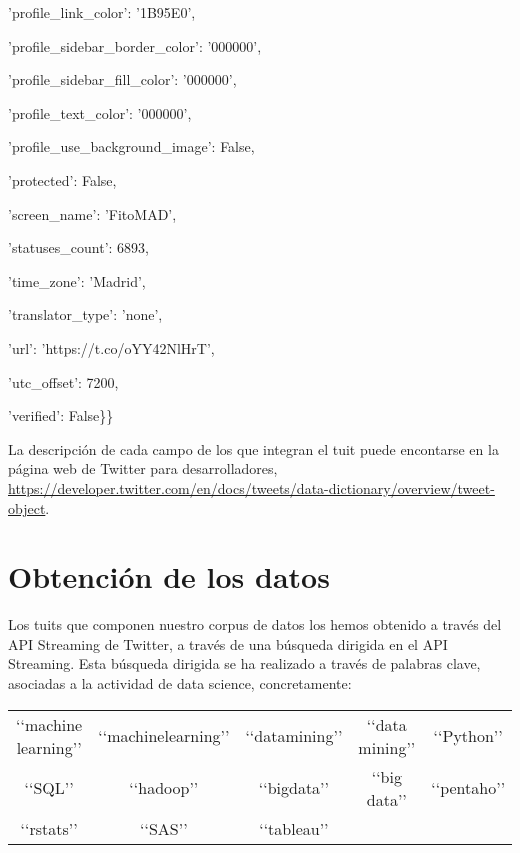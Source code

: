 \hspace{1.7cm}'profile\_link\_color': '1B95E0',

\hspace{1.7cm}'profile\_sidebar\_border\_color': '000000',

\hspace{1.7cm}'profile\_sidebar\_fill\_color': '000000',

\hspace{1.7cm}'profile\_text\_color': '000000',

\hspace{1.7cm}'profile\_use\_background\_image': False,

\hspace{1.7cm}'protected': False,

\hspace{1.7cm}'screen\_name': 'FitoMAD',

\hspace{1.7cm}'statuses\_count': 6893,

\hspace{1.7cm}'time\_zone': 'Madrid',

\hspace{1.7cm}'translator\_type': 'none',

\hspace{1.7cm}'url': 'https://t.co/oYY42NlHrT',

\hspace{1.7cm}'utc\_offset': 7200,

\hspace{1.7cm}'verified': False\}\}

\bigskip

La descripción de cada campo de los que integran el tuit puede encontarse en la página web de Twitter para 
desarrolladores, \url{https://developer.twitter.com/en/docs/tweets/data-dictionary/overview/tweet-object}.

\section{Obtenci\'on de los datos}
Los tuits que componen nuestro corpus de datos los hemos obtenido a través del API Streaming
de Twitter, a través de una búsqueda dirigida en el API Streaming. Esta búsqueda dirigida 
se ha realizado a través de palabras clave, asociadas a la actividad de data science, concretamente:

\begin{center}
\begin{tabular}{ccccc}
\lq\lq machine learning\rq\rq  &\lq\lq machinelearning\rq\rq  &\lq\lq datamining\rq\rq  &\lq\lq data mining\rq\rq 
&\lq\lq Python\rq\rq\\
\lq\lq SQL\rq\rq & \lq\lq hadoop\rq\rq  &\lq\lq bigdata\rq\rq  &\lq\lq big data\rq\rq  &\lq\lq pentaho\rq\rq\\
\lq\lq rstats\rq\rq &\lq\lq SAS\rq\rq &\lq\lq tableau\rq\rq
\end{tabular}
\end{center}

